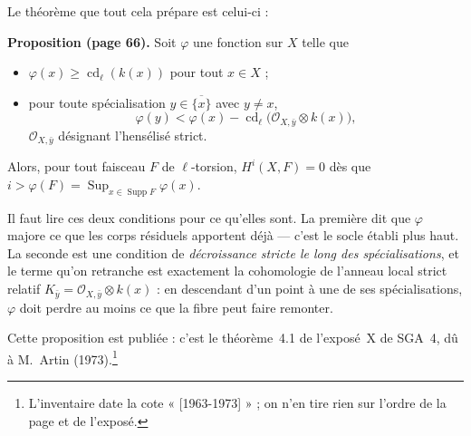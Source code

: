 \documentclass[11pt,a4paper]{article}
\begin{document}
Le théorème que tout cela prépare est celui-ci :

\textbf{Proposition (page 66).} Soit $\varphi$ une fonction sur $X$ telle que
\begin{itemize}
\item[a)] $\varphi(x) \geqslant \operatorname{cd}_{\ell}(k(x))$ pour tout
$x \in X$ ;
\item[b)] pour toute spécialisation $y \in \overline{\{x\}}$ avec $y \neq x$,
\[
\varphi(y) < \varphi(x) - \operatorname{cd}_{\ell}
\bigl(\mathcal{O}_{X,\bar{y}} \otimes k(x)\bigr),
\]
$\mathcal{O}_{X,\bar{y}}$ désignant l'hensélisé strict.
\end{itemize}
Alors, pour tout faisceau $F$ de $\ell$-torsion,
$H^i(X,F) = 0$ dès que $i > \varphi(F) =
\operatorname*{Sup}_{x \in \operatorname{Supp} F} \varphi(x)$.

Il faut lire ces deux conditions pour ce qu'elles sont. La première dit que
$\varphi$ majore ce que les corps résiduels apportent déjà — c'est le socle
établi plus haut. La seconde est une condition de \emph{décroissance stricte le
long des spécialisations}, et le terme qu'on retranche est exactement la
cohomologie de l'anneau local strict relatif $K_{\bar{y}} =
\mathcal{O}_{X,\bar{y}} \otimes k(x)$ : en descendant d'un point à une de ses
spécialisations, $\varphi$ doit perdre au moins ce que la fibre peut faire
remonter.

Cette proposition est publiée : c'est le théorème~4.1 de l'exposé~X de
SGA~4, dû à M.~Artin (1973).\footnote{L'inventaire date la cote
« [1963-1973] » ; on n'en tire rien sur l'ordre de la page et de l'exposé.}
\end{document}

